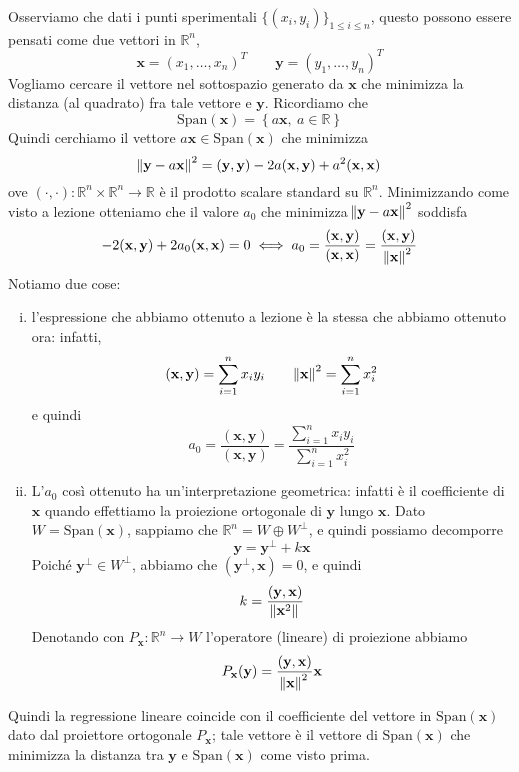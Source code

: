 \begin{remark}
    Osserviamo che dati i punti sperimentali $\{(x_i, y_i)\}_{1\le i \le n}$, questo possono essere pensati come due vettori in $\mathbb{R}^n$, 
\[
 \mathbf{x}=(x_1, \dots, x_n)^T \qquad \mathbf{y} = (y_1, \dots, y_n)^T
\]
Vogliamo cercare il vettore nel sottospazio generato da $\mathbf{x}$ che minimizza la distanza (al quadrato) fra tale vettore e $\mathbf{y}$. Ricordiamo che 
\[
\mathrm{Span}(\mathbf{x}) = \left\{a\mathbf{x}, \ a\in\mathbb{R}\right\}
\]
Quindi cerchiamo il vettore $a\mathbf{x}\in\mathrm{Span}(\mathbf{x})$ che minimizza
\[
\norm{\mathbf{y}-a\mathbf{x}}^2 = (\mathbf{y}, \mathbf{y})-2a(\mathbf{x}, \mathbf{y}) + a^2(\mathbf{x}, \mathbf{x})
\]
ove $( \cdot, \cdot)\colon \mathbb{R}^n \times \mathbb{R}^n \to \mathbb{R}$ è il prodotto scalare standard su $\mathbb{R}^n$. Minimizzando come visto a lezione otteniamo che il valore $a_0$ che minimizza $\norm{\mathbf{y}-a\mathbf{x}}^2$ soddisfa
\[
-2(\mathbf{x}, \mathbf{y}) + 2a_0(\mathbf{x}, \mathbf{x}) = 0 \iff a_0 = \frac{(\mathbf{x}, \mathbf{y})}{(\mathbf{x}, \mathbf{x})} = \frac{(\mathbf{x}, \mathbf{y})}{\norm{\mathbf{x}}^2}
\]
Notiamo due cose:
\begin{enumerate}[(i)]
    \item l'espressione che abbiamo ottenuto a lezione è la stessa che abbiamo ottenuto ora: infatti,
    \[
    (\mathbf{x}, \mathbf{y}) = \sum_{i=1}^n x_i y_i \qquad \norm{\mathbf{x}}^2 = \sum_{i=1}^n x_i^2
    \]
    e quindi
    \[
    a_0 = \frac{(\mathbf{x}, \mathbf{y})}{(\mathbf{x}, \mathbf{y})} = \frac{\sum_{i=1}^n x_iy_i}{\sum_{i=1}^n x_i^2}
    \]
    \item L'$a_0$ così ottenuto ha un'interpretazione geometrica: infatti è il coefficiente di $\mathbf{x}$ quando effettiamo la proiezione ortogonale di $\mathbf{y}$ lungo $\mathbf{x}$. Dato $W = \mathrm{Span}(\mathbf{x})$, sappiamo che $\mathbb{R}^n = W \oplus W^\perp$, e quindi possiamo decomporre
    \[
    \mathbf{y} = \mathbf{y}^\perp + k\mathbf{x}
    \]
    Poiché $\mathbf{y}^\perp\in W^\perp$, abbiamo che $(\mathbf{y}^\perp, \mathbf{x})=0$, e quindi
    \[
    k= \frac{(\mathbf{y}, \mathbf{x})}{\norm{\mathbf{x}^2}}
    \]
    Denotando con $P_{\mathbf{x}}\colon \mathbb{R}^n\to W$ l'operatore (lineare) di proiezione abbiamo
    \[
    P_{\mathbf{x}}(\mathbf{y}) = \frac{(\mathbf{y}, \mathbf{x})}{\norm{\mathbf{x}}^2}\mathbf{x}
    \]
\end{enumerate}
Quindi la regressione lineare coincide con il coefficiente del vettore in $\mathrm{Span}(\mathbf{x})$ dato dal proiettore ortogonale $P_{\mathbf{x}}$; tale vettore è il vettore di $\mathrm{Span}(\mathbf{x})$ che minimizza la distanza tra $\mathbf{y}$ e $\mathrm{Span}(\mathbf{x})$ come visto prima.\\

\end{remark}

